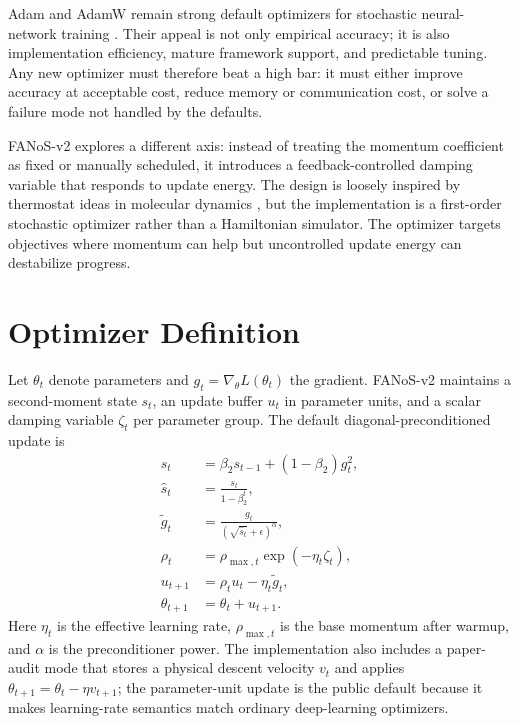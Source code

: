 \documentclass[11pt]{article}
\begin{document}
Adam and AdamW remain strong default optimizers for stochastic neural-network training \cite{kingma2014adam,loshchilov2017adamw}. Their appeal is not only empirical accuracy; it is also implementation efficiency, mature framework support, and predictable tuning. Any new optimizer must therefore beat a high bar: it must either improve accuracy at acceptable cost, reduce memory or communication cost, or solve a failure mode not handled by the defaults.

FANoS-v2 explores a different axis: instead of treating the momentum coefficient as fixed or manually scheduled, it introduces a feedback-controlled damping variable that responds to update energy. The design is loosely inspired by thermostat ideas in molecular dynamics \cite{nose1984unified,hoover1985canonical}, but the implementation is a first-order stochastic optimizer rather than a Hamiltonian simulator. The optimizer targets objectives where momentum can help but uncontrolled update energy can destabilize progress.

\section{Optimizer Definition}

Let $\theta_t$ denote parameters and $g_t = \nabla_\theta L(\theta_t)$ the gradient. FANoS-v2 maintains a second-moment state $s_t$, an update buffer $u_t$ in parameter units, and a scalar damping variable $\zeta_t$ per parameter group. The default diagonal-preconditioned update is
\begin{align}
s_t &= \beta_2 s_{t-1} + (1-\beta_2) g_t^2,\\
\hat{s}_t &= \frac{s_t}{1-\beta_2^t},\\
\tilde{g}_t &= \frac{g_t}{(\sqrt{\hat{s}_t}+\epsilon)^\alpha},\\
\rho_t &= \rho_{\max,t}\exp(-\eta_t \zeta_t),\\
u_{t+1} &= \rho_t u_t - \eta_t \tilde{g}_t,\\
\theta_{t+1} &= \theta_t + u_{t+1}.
\end{align}
Here $\eta_t$ is the effective learning rate, $\rho_{\max,t}$ is the base momentum after warmup, and $\alpha$ is the preconditioner power. The implementation also includes a paper-audit mode that stores a physical descent velocity $v_t$ and applies $\theta_{t+1}=\theta_t-\eta v_{t+1}$; the parameter-unit update is the public default because it makes learning-rate semantics match ordinary deep-learning optimizers.
\end{document}
